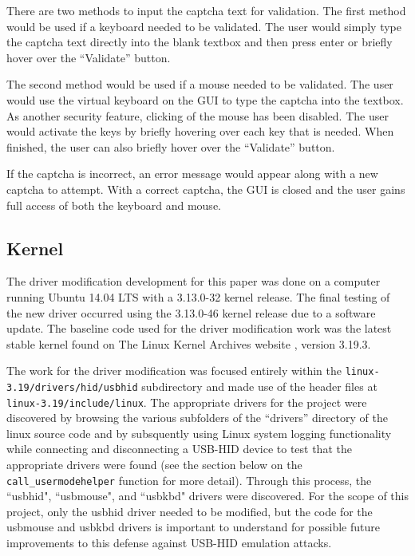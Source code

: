\documentclass[pagenumbers]{ieee}
\begin{document}
There are two methods to input the captcha text for validation. The first method would be used if a keyboard needed to be validated. The user would simply type the captcha text directly into the blank textbox and then press enter or briefly hover over the ``Validate'' button.

The second method would be used if a mouse needed to be validated. The user would use the virtual keyboard on the GUI to type the captcha into the textbox. As another security feature, clicking of the mouse has been disabled. The user would activate the keys by briefly hovering \cite{hover} over each key that is needed. When finished, the user can also briefly hover over the ``Validate'' button.

If the captcha is incorrect, an error message would appear along with a new captcha to attempt. With a correct captcha, the GUI is closed and the user gains full access of both the keyboard and mouse.


\subsection{Kernel}

The driver modification development for this paper was done on a computer running Ubuntu 14.04 LTS with a 3.13.0-32 kernel release. The final testing of the new driver occurred using the 3.13.0-46 kernel release due to a software update. The baseline code used for the driver modification work was the latest stable kernel found on The Linux Kernel Archives website \cite{kernel}, version 3.19.3. 

The work for the driver modification was focused entirely within the \texttt{linux-3.19/drivers/hid/usbhid} subdirectory and made use of the header files at \texttt{linux-3.19/include/linux}. The appropriate drivers for the project were discovered by browsing the various subfolders of the ``drivers'' directory of the linux source code and by subsquently using Linux system logging functionality while connecting and disconnecting a USB-HID device to test that the appropriate drivers were found (see the section below on the \texttt{call\_usermodehelper} function for more detail). Through this process, the ``usbhid", ``usbmouse", and ``usbkbd" drivers were discovered. For the scope of this project, only the usbhid driver needed to be modified, but the code for the usbmouse and usbkbd drivers is important to understand for possible future improvements to this defense against USB-HID emulation attacks.
\end{document}

